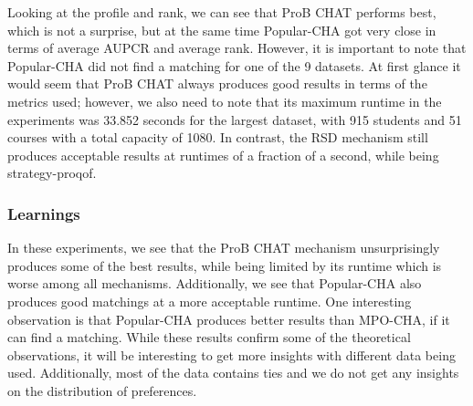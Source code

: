 Looking at the profile and rank, we can see that ProB CHAT performs best, which is not a surprise, but at the same time Popular-CHA got very close in terms of average AUPCR and average rank. However, it is important to note that Popular-CHA did not find a matching for one of the 9 datasets. At first glance it would seem that ProB CHAT always produces good results in terms of the metrics used; however, we also need to note that its maximum runtime in the experiments was 33.852 seconds for the largest dataset, with 915 students and 51 courses with a total capacity of 1080. In contrast, the RSD mechanism still produces acceptable results at runtimes of a fraction of a second, while being strategy-proqof.

\subsubsection{Learnings}
In these experiments, we see that the ProB CHAT mechanism unsurprisingly produces some of the best results, while being limited by its runtime which is worse among all mechanisms. Additionally, we see that Popular-CHA also produces good matchings at a more acceptable runtime. One interesting observation is that Popular-CHA produces better results than MPO-CHA, if it can find a matching. While these results confirm some of the theoretical observations, it will be interesting to get more insights with different data being used. Additionally, most of the data contains ties and we do not get any insights on the distribution of preferences. 